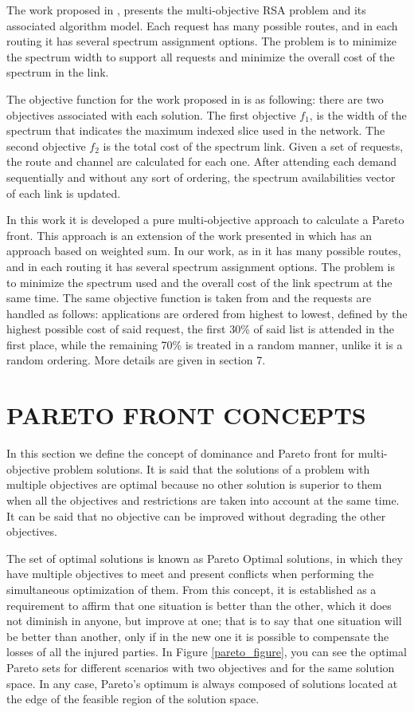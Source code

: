 The work proposed in \cite{moga-rsa-dao}, presents the multi-objective
RSA problem and its associated algorithm model. Each request has many
possible routes, and in each routing it has several spectrum assignment
options. The problem is to minimize the spectrum width to support
all requests and minimize the overall cost of the spectrum in the
link. 

The objective function for the work proposed in \cite{moga-rsa-dao}
is as following: there are two objectives associated with each solution.
The first objective $f_{1}$, is the width of the spectrum that indicates
the maximum indexed slice used in the network. The second objective
$f_{2}$ is the total cost of the spectrum link. Given a set of requests,
the route and channel are calculated for each one. After attending
each demand sequentially and without any sort of ordering, the spectrum
availabilities vector of each link is updated. 

In this work it is developed a pure multi-objective approach to calculate
a Pareto front. This approach is an extension of the work presented
in \cite{engopt} which has an approach based on weighted sum. In
our work, as in \cite{moga-rsa-dao} it has many possible routes,
and in each routing it has several spectrum assignment options. The
problem is to minimize the spectrum used and the overall cost of the
link spectrum at the same time. The same objective function is taken
from \cite{moga-rsa-dao} and the requests are handled as follows:
applications are ordered from highest to lowest, defined by the highest
possible cost of said request, the first 30\% of said list is attended
in the first place, while the remaining 70\% is treated in a random
manner, unlike \cite{moga-rsa-dao} it is a random ordering. More
details are given in section 7. 

\section{PARETO FRONT CONCEPTS }

In this section we define the concept of dominance and Pareto front
for multi-objective problem solutions. It is said that the solutions
of a problem with multiple objectives are optimal because no other
solution is superior to them when all the objectives and restrictions
are taken into account at the same time. It can be said that no objective
can be improved without degrading the other objectives. 

The set of optimal solutions is known as Pareto Optimal solutions,
in which they have multiple objectives to meet and present conflicts
when performing the simultaneous optimization of them. From this concept,
it is established as a requirement to affirm that one situation is
better than the other, which it does not diminish in anyone, but improve
at one; that is to say that one situation will be better than another,
only if in the new one it is possible to compensate the losses of
all the injured parties. In Figure \ref{pareto_figure}, you can see
the optimal Pareto sets for different scenarios with two objectives
and for the same solution space. In any case, Pareto's optimum is
always composed of solutions located at the edge of the feasible region
of the solution space.


